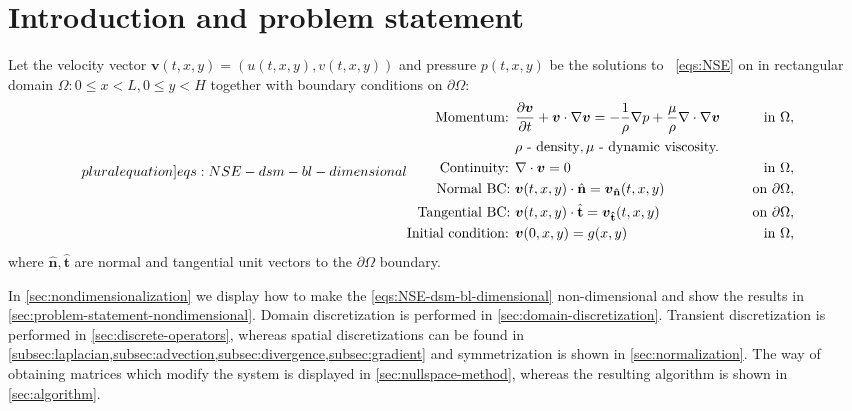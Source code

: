\documentclass{article}
\numberwithin{equation}{section}
\begin{document}
\section{Introduction and problem statement}\label{sec:problem-statement-dimentional}
Let the velocity vector $\boldsymbol{v}(t,x,y)=(u(t,x,y),v(t,x,y))$ and pressure $p(t,x,y)$ be the solutions to ~\cref{eqs:NSE} on in rectangular domain $\Omega:0\leq x < L, 0\leq y < H$ together with boundary conditions on $\partial\Omega$:
\begin{subequations}
\label[pluralequation]{eqs:NSE-dsm-bl-dimensional}
\begin{align}
\label{eqn:momentum-dimensional}
\text{Momentum: }	&\frac{\partial \boldsymbol{v}}{\partial t} + \boldsymbol{v} \cdot \nabla \boldsymbol{v} = -\frac{1}{\rho}\nabla p + {\frac{\mu}{\rho}} \nabla \cdot \nabla \boldsymbol{v}\quad&\text{ in }\Omega,\\
&\rho\text{ - density}, \mu\text{ - dynamic viscosity.}\notag\\
\label{eqn:continuity-dsm-bl}
\text{Continuity: }	& \nabla \cdot \boldsymbol{v} = 0\quad&\text{ in }\Omega, \\ 
\label{eqn:NSE-bc-normal-dimensional}
\text{Normal BC: } & \boldsymbol{v}(t,x,y)\cdot\hat{\mathbf{n}}=\boldsymbol{v}_\mathbf{\hat{n}}(t,x,y) \quad&\text{ on }\partial\Omega, \\
\label{eqn:NSE-bc-tangential-dimensional}
\text{Tangential BC: } & \boldsymbol{v}(t,x,y)\cdot\hat{\mathbf{t}}=\boldsymbol{v}_\mathbf{\hat{t}}(t,x,y) \quad&\text{ on }\partial\Omega, \\
\label{eqn:NSE-ic-dimensional}
\text{Initial condition: } &\boldsymbol{v}(0,x,y)=g(x,y) \quad&\text{ in }\Omega,
\end{align}
\end{subequations}
where $\hat{\mathbf{n}},\hat{\mathbf{t}}$ are normal and tangential unit vectors to the $\partial\Omega$ boundary.

In \cref{sec:nondimensionalization} we display how to make the \cref{eqs:NSE-dsm-bl-dimensional} non-dimensional and show the results in \cref{sec:problem-statement-nondimensional}. Domain discretization is performed in \cref{sec:domain-discretization}. Transient discretization is performed in \cref{sec:discrete-operators}, whereas spatial discretizations can be found in \cref{subsec:laplacian,subsec:advection,subsec:divergence,subsec:gradient} and symmetrization is shown in \cref{sec:normalization}. The way of obtaining matrices which modify the system is displayed in \cref{sec:nullspace-method}, whereas the resulting algorithm is shown in \cref{sec:algorithm}.
\end{document}
